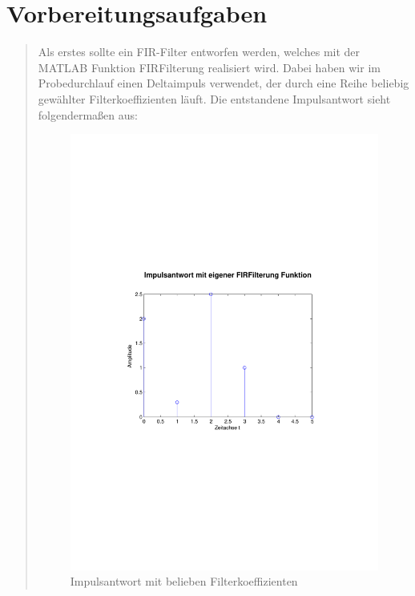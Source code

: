 \section{Vorbereitungsaufgaben}
\begin{quote}
    
	Als erstes sollte ein FIR-Filter entworfen werden, welches mit der MATLAB
	Funktion FIRFilterung realisiert wird. Dabei haben wir im Probedurchlauf einen
	Deltaimpuls verwendet, der durch eine Reihe beliebig gewählter
	Filterkoeffizienten läuft. Die entstandene Impulsantwort sieht folgendermaßen
	aus:
	
	\begin{figure}[H]
            \centering
                \includegraphics[scale=0.5, trim = 1cm 6cm 1.5cm 8cm,
                clip]{./Bilder/Impulsantwort_aufgabe1}
                    \caption{Impulsantwort mit belieben Filterkoeffizienten}
                    \label{fig:./Bilder/Impulsantwort_aufgabe1}
            \end{figure}
            

\end{quote}
